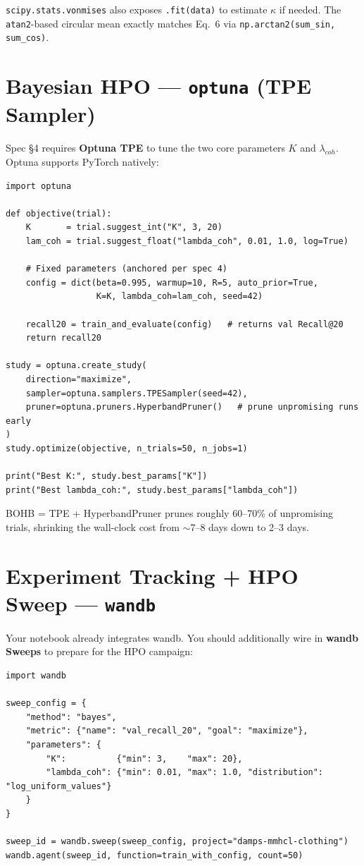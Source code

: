 \documentclass[11pt, a4paper]{article}
\begin{document}
\texttt{scipy.stats.vonmises} also exposes \texttt{.fit(data)} to estimate $\kappa$ if needed. The \texttt{atan2}-based circular mean exactly matches Eq.~6 via \texttt{np.arctan2(sum\_sin, sum\_cos)}.

\section{Bayesian HPO --- \texttt{optuna} (TPE Sampler)}

Spec \S4 requires \textbf{Optuna TPE} to tune the two core parameters $K$ and $\lambda_{coh}$. Optuna supports PyTorch natively:

\begin{lstlisting}
import optuna

def objective(trial):
    K       = trial.suggest_int("K", 3, 20)
    lam_coh = trial.suggest_float("lambda_coh", 0.01, 1.0, log=True)

    # Fixed parameters (anchored per spec 4)
    config = dict(beta=0.995, warmup=10, R=5, auto_prior=True,
                  K=K, lambda_coh=lam_coh, seed=42)

    recall20 = train_and_evaluate(config)   # returns val Recall@20
    return recall20

study = optuna.create_study(
    direction="maximize",
    sampler=optuna.samplers.TPESampler(seed=42),
    pruner=optuna.pruners.HyperbandPruner()   # prune unpromising runs early
)
study.optimize(objective, n_trials=50, n_jobs=1)

print("Best K:", study.best_params["K"])
print("Best lambda_coh:", study.best_params["lambda_coh"])
\end{lstlisting}

BOHB = TPE + HyperbandPruner prunes roughly 60--70\% of unpromising trials, shrinking the wall-clock cost from $\sim$7--8 days down to 2--3 days.

\section{Experiment Tracking + HPO Sweep --- \texttt{wandb}}

Your notebook already integrates wandb. You should additionally wire in \textbf{wandb Sweeps} to prepare for the HPO campaign:

\begin{lstlisting}
import wandb

sweep_config = {
    "method": "bayes",
    "metric": {"name": "val_recall_20", "goal": "maximize"},
    "parameters": {
        "K":          {"min": 3,    "max": 20},
        "lambda_coh": {"min": 0.01, "max": 1.0, "distribution": "log_uniform_values"}
    }
}

sweep_id = wandb.sweep(sweep_config, project="damps-mmhcl-clothing")
wandb.agent(sweep_id, function=train_with_config, count=50)
\end{lstlisting}
\end{document}
